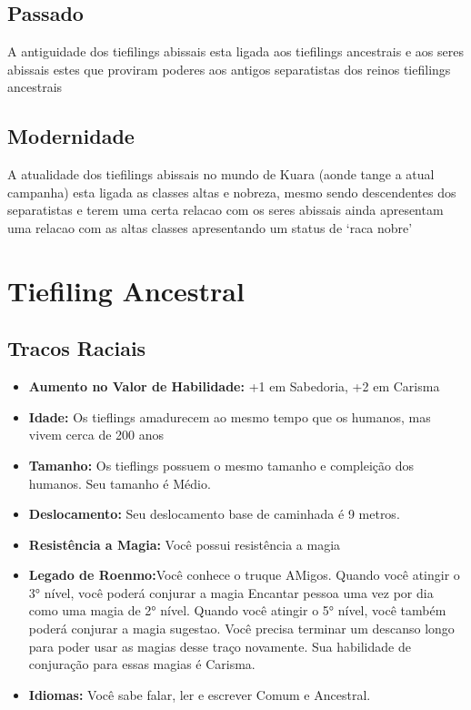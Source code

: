 \documentclass{book}
\begin{document}
\section{Passado}
A antiguidade dos tiefilings abissais esta ligada aos tiefilings ancestrais e aos seres 
abissais estes que proviram poderes aos antigos separatistas dos reinos tiefilings ancestrais
\section{Modernidade}
A atualidade dos tiefilings abissais no mundo de Kuara (aonde tange a atual campanha) esta 
ligada as classes altas e nobreza, mesmo sendo descendentes dos separatistas e terem uma certa 
relacao com os seres abissais ainda apresentam uma relacao com as altas classes apresentando 
um status de `raca nobre'

\chapter{Tiefiling Ancestral}
\section{Tracos Raciais}
\begin{itemize}
    \item \textbf{Aumento no Valor de Habilidade:} +1 em Sabedoria, +2 em Carisma
    \item \textbf{Idade:} Os tieflings amadurecem ao mesmo tempo que os humanos, mas vivem 
          cerca de 200 anos
    \item \textbf{Tamanho:} Os tieflings possuem o mesmo tamanho e compleição dos humanos. 
          Seu tamanho é Médio.
    \item \textbf{Deslocamento:} Seu deslocamento base de caminhada é 9 metros.
    \item \textbf{Resistência a Magia:} Você possui resistência a magia
    \item \textbf{Legado de Roenmo:}Você conhece o truque AMigos. Quando você atingir o
          3° nível, você poderá conjurar a magia Encantar pessoa uma vez por dia
          como uma magia de 2° nível. Quando você atingir o 5° nível, você também poderá 
          conjurar a magia sugestao. Você precisa terminar um descanso longo para poder usar
          as magias desse traço novamente. Sua habilidade de conjuração para essas magias é 
          Carisma.
    \item \textbf{Idiomas:} Você sabe falar, ler e escrever Comum e Ancestral.

\end{itemize}
\end{document}
